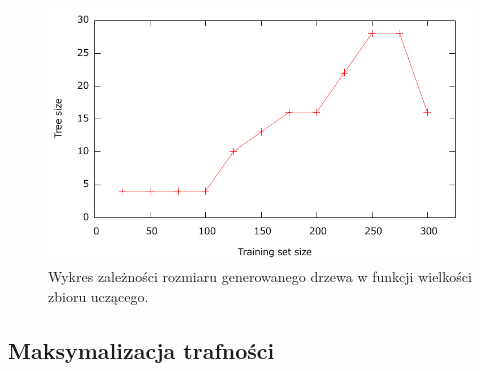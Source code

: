 \begin{itemize}
\begin{figure}	
	\includegraphics[scale=0.7]{figures/part1/task7/size.pdf}
	\caption{Wykres zależności rozmiaru generowanego drzewa w funkcji wielkości zbioru uczącego.}
	\label{p1t7-rozmiar}
\end{figure}

\end{itemize}

\subsection{Maksymalizacja trafności}

